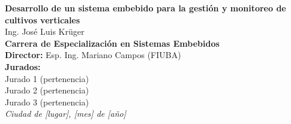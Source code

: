 \begin{titlepage}

    \begin{flushright}
        \setlength{\rightskip}{-2cm} %
        \vspace*{7.5cm} %

        {\bfseries\fontsize{33pt}{40pt}\selectfont
        Desarrollo de un sistema embebido para la gestión y monitoreo de cultivos verticales} \\[1.5cm]

        {\fontsize{20pt}{25pt}\selectfont
        Ing. José Luis Krüger} \\[1cm]

        {\fontsize{15pt}{20pt}\selectfont
        \textbf{Carrera de Especialización en Sistemas Embebidos}
        } \\[2cm]

        {\fontsize{11pt}{15pt}\selectfont
        \textbf{Director:} Esp. Ing. Mariano Campos (FIUBA)} \\[1cm]

        {\fontsize{11pt}{15pt}\selectfont
        \textbf{Jurados:}} \\[0.5cm]
        {\fontsize{11pt}{15pt}\selectfont
        Jurado 1 (pertenencia)} \\ 
        {\fontsize{11pt}{15pt}\selectfont
        Jurado 2 (pertenencia)} \\ 
        {\fontsize{11pt}{15pt}\selectfont
        Jurado 3 (pertenencia)} \\[2cm]

        {\itshape\fontsize{10pt}{12pt}\selectfont
        Ciudad de [lugar], [mes] de [año]} %
    \end{flushright}
\end{titlepage}
